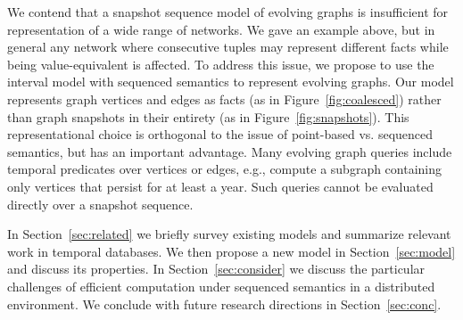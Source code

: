 

We contend that a snapshot sequence model of evolving graphs is
insufficient for representation of a wide range of networks.  We gave
an example above, but in general any network where consecutive tuples
may represent different facts while being value-equivalent is
affected. To address this issue, we propose to use the interval model
with sequenced semantics to represent evolving graphs. Our model
represents graph vertices and edges as facts (as in
Figure~\ref{fig:coalesced}) rather than graph snapshots in their
entirety (as in Figure~\ref{fig:snapshots}).  This representational
choice is orthogonal to the issue of point-based vs. sequenced
semantics, but has an important advantage.  Many evolving graph
queries include temporal predicates over vertices or edges, e.g.,
compute a subgraph containing only vertices that persist for at least
a year.  Such queries cannot be evaluated directly over a snapshot
sequence.

%

In Section~\ref{sec:related} we briefly survey existing models and
summarize relevant work in temporal databases.  We then propose a new
model in Section~\ref{sec:model} and discuss its properties.  In
Section~\ref{sec:consider} we discuss the particular challenges of
efficient computation under sequenced semantics in a distributed
environment.  We conclude with future research directions in
Section~\ref{sec:conc}.



